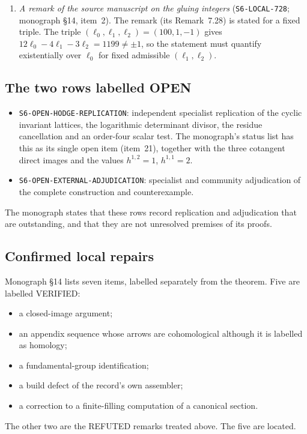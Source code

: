 \begin{enumerate}[label=\arabic*.]
\begin{itemize}
\end{itemize}
\item \emph{A remark of the source manuscript on the gluing integers} (\texttt{S6-LOCAL-728}; monograph §14, item~2). The remark (its Remark~7.28) is stated for a fixed triple. The triple $(\ell_0,\ell_1,\ell_2)=(100,1,-1)$ gives $12\ell_0-4\ell_1-3\ell_2=1199\neq\pm1$, so the statement must quantify existentially over $\ell_0$ for fixed admissible $(\ell_1,\ell_2)$. 
\end{enumerate}

\subsection{The two rows labelled \textsf{OPEN}}\label{ssec:openrows}

\begin{itemize}
\item \texttt{S6-OPEN-HODGE-REPLICATION}: independent specialist replication of the cyclic invariant lattices, the logarithmic determinant divisor, the residue cancellation and an order-four scalar test. The monograph's status list has this as its single open item (item~21), together with the three cotangent direct images and the values $h^{1,2}=1$, $h^{1,1}=2$.
\item \texttt{S6-OPEN-EXTERNAL-ADJUDICATION}: specialist and community adjudication of the complete construction and counterexample.
\end{itemize}
The monograph states that these rows record replication and adjudication that are outstanding, and that they are not unresolved premises of its proofs.

\subsection{Confirmed local repairs}

Monograph §14 lists seven items, labelled separately from the theorem. Five are labelled \textsf{VERIFIED}:
\begin{itemize}
\item a closed-image argument;
\item an appendix sequence whose arrows are cohomological although it is labelled as homology;
\item a fundamental-group identification;
\item a build defect of the record's own assembler;
\item a correction to a finite-filling computation of a canonical section.
\end{itemize}
The other two are the \textsf{REFUTED} remarks treated above. The five are \textsf{located}.
